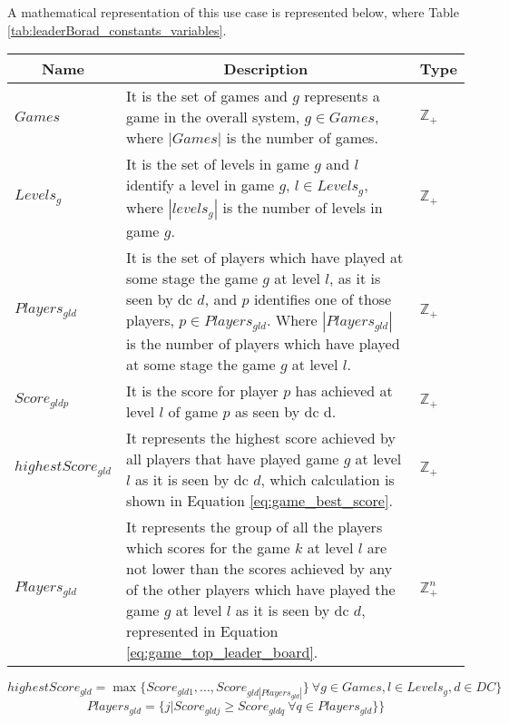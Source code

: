 A mathematical representation of this use case is represented below, where Table \ref{tab:leaderBorad_constants_variables}.
\begin{table*}[!ht]
	\begin{tabular}{|p{2.2cm}|p{11.5cm}|p{.8cm}| }
		\hline
		\multicolumn{1}{|c|}{Name} & \multicolumn{1}{c|}{Description} & \multicolumn{1}{c|}{Type} \\
		\hline
		\hline
			$Games$ & It is the set of games and $g$ represents a game in the overall system, $g \in Games$, where $|Games|$ is the number of games. & $\mathbb{Z}_{+}$ \\
		\hline
			$Levels_{g}$ & It is the set of levels in game $g$ and $l$ identify a level in game $g$, $l \in Levels_{g}$, where $|levels_{g}|$ is the number of levels in game $g$. & $\mathbb{Z}_{+}$ \\
		\hline
			$Players_{gld}$ & It is the set of players which have played at some stage the game $g$ at level $l$, as it is seen by \gls{dc} $d$, and $p$ identifies one of those players, $p \in Players_{gld}$. Where $|Players_{gld}|$ is the number of players which have played at some stage the game $g$ at level $l$. & $\mathbb{Z}_{+}$ \\
		\hline
			$Score_{gldp}$ & It is the score for player $p$ has achieved at level $l$ of game $p$ as seen by \gls{dc} d. & $\mathbb{Z}_{+}$ \\
		\hline
			$highestScore_{gld}$ & It represents the highest score achieved by all players that have played game $g$ at level $l$ as it is seen by \gls{dc} $d$, which calculation is shown in Equation \ref{eq:game_best_score}. & $\mathbb{Z}_{+}$ \\
		\hline
			$Players_{gld}$ & It represents the group of all the players which scores for the game $k$ at level $l$ are not lower than the scores achieved by any of the other players which have played the game $g$ at level $l$ as it is seen by \gls{dc} $d$, represented in Equation \ref{eq:game_top_leader_board}. & $\mathbb{Z}^{n}_{+}$ \\
		\hline
	\end{tabular}
			
	\caption{Leader Board Constants and Variables.}
	\label{tab:leaderBorad_constants_variables}
\end{table*}
\begin{equation} \label{eq:game_best_score}
	highestScore_{gld} = \max\{Score_{gld1},\dots, Score_{gld|Players_{gld}|}\} ~ \forall g \in Games, l \in Levels_{g}, d \in DC\}
\end{equation}
\begin{equation} \label{eq:game_top_leader_board}
	Players_{gld} = \{j | Score_{gldj} \ge Score_{gldq} ~ \forall q \in Players_{gld}\}\}
\end{equation}

